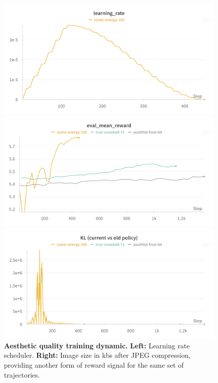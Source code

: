 \begin{figure}[ht]
  \centering
  \begin{minipage}{0.2\textwidth}
      \centering
      \includegraphics[width=1\textwidth]{img/results/laion-lr.png} 
  \end{minipage}\hfill
  \begin{minipage}{0.6\textwidth}
      \centering
      \includegraphics[width=1\textwidth]{img/results/laion-eval-mean-reward.png} 
  \end{minipage}\hfill 
  \begin{minipage}{0.2\textwidth}
      \centering
      \includegraphics[width=1\textwidth]{img/results/laion-kl.png} 
  \end{minipage}
  \vspace{-8pt}  %
    \captionsetup{width=\textwidth} %
    \caption{\textbf{Aesthetic quality training dynamic.} \textbf{Left:} Learning rate scheduler. \textbf{Right:} Image size in kbs after JPEG compression, providing another form of reward signal for the same set of trajectories.}
  \label{fig:laion-train-dynamic} %
\end{figure}


